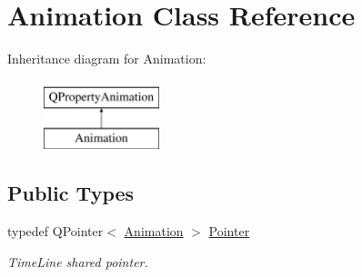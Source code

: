 \hypertarget{class_animation}{}\section{Animation Class Reference}
\label{class_animation}
Inheritance diagram for Animation\+:\begin{figure}[H]
\begin{center}
\leavevmode
\includegraphics[height=2.000000cm]{class_animation}
\end{center}
\end{figure}
\subsection*{Public Types}
\begin{DoxyCompactItemize}
\item 
\mbox{\label{class_animation_ac48a8d074abd43dc3f6485353ba24e30}} 
typedef Q\+Pointer$<$ \hyperlink{class_animation}{Animation} $>$ \hyperlink{class_animation_ac48a8d074abd43dc3f6485353ba24e30}{Pointer}
\begin{DoxyCompactList}\small\item\em Time\+Line shared pointer. \end{DoxyCompactList}\end{DoxyCompactItemize}
